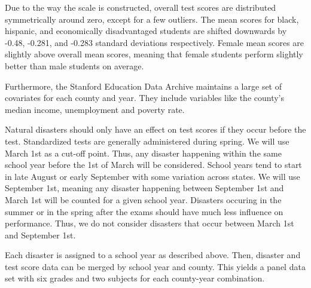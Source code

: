 Due to the way the scale is constructed, overall test scores are distributed symmetrically around zero, except for a few outliers. The mean scores for black, hispanic, and economically disadvantaged students are shifted downwards by -0.48, -0.281, and -0.283 standard deviations respectively. Female mean scores are slightly above overall mean scores, meaning that female students perform slightly better than male students on average.

Furthermore, the Stanford Education Data Archive maintains a large set of covariates for each county and year. They include variables like the county's median income, unemployment and poverty rate.

Natural disasters should only have an effect on test scores if they occur before the test. Standardized tests are generally administered during spring. We will use March 1st as a cut-off point. Thus, any disaster happening within the same school year before the 1st of March will be considered. School years tend to start in late August or early September with some variation across states. We will use September 1st, meaning any disaster happening between September 1st and March 1st will be counted for a given school year. Disasters occuring in the summer or in the spring after the exams should have much less influence on performance. Thus, we do not consider disasters that occur between March 1st and September 1st.

Each disaster is assigned to a school year as described above. Then, disaster and test score data can be merged by school year and county. This yields a panel data set with six grades and two subjects for each county-year combination.

